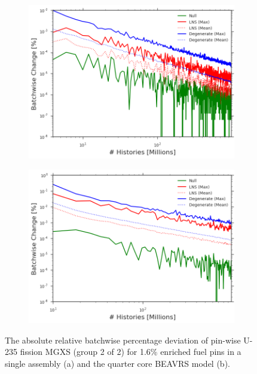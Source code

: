 \begin{figure}[h!]
\centering
\begin{subfigure}{.87\textwidth}
  \centering
  \includegraphics[width=\linewidth]{figures/patterns/convergence/assm-16/assm-16-dev-fission-2}
  \caption{}
  \label{fig:chap9-assm-16-dev-fiss-2}
\end{subfigure}
\begin{subfigure}{.87\textwidth}
  \centering
  \includegraphics[width=\linewidth]{figures/patterns/convergence/full-core/16-enr-dev-fission-2}
  \caption{}
  \label{fig:chap9-full-core-dev-fiss-2}
\end{subfigure}
\caption[Convergence of U-235 fission MGXS batchwise deviation]{The absolute relative batchwise percentage deviation of pin-wise U-235 fission \ac{MGXS} (group 2 of 2) for 1.6\% enriched fuel pins in a single assembly (a) and the quarter core \ac{BEAVRS} model (b).}
\label{fig:chap9-fiss-2-dev}
\end{figure}

